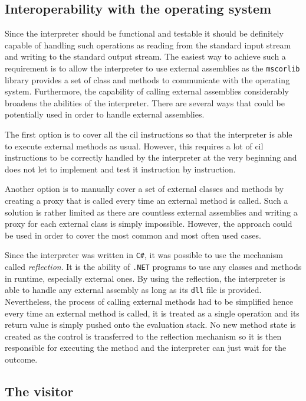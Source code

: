 \documentclass[declaration,shortabstract,english,mgr]{iithesis}
\begin{document}
\subsection{Interoperability with the operating system}

Since the interpreter should be functional and testable it should be definitely capable of handling such operations as reading from the standard input stream and writing to the standard output stream. The easiest way to achieve such a requirement is to allow the interpreter to use external assemblies as the \texttt{mscorlib} library provides a set of class and methods to communicate with the operating system. Furthermore, the capability of calling external assemblies considerably broadens the abilities of the interpreter. There are several ways that could be potentially used in order to handle external assemblies.

The first option is to cover all the \acrshort{cil} instructions so that the interpreter is able to execute external methods as usual. However, this requires a lot of \acrshort{cil} instructions to be correctly handled by the interpreter at the very beginning and does not let to implement and test it instruction by instruction.

Another option is to manually cover a set of external classes and methods by creating a proxy that is called every time an external method is called. Such a solution is rather limited as there are countless external assemblies and writing a proxy for each external class is simply impossible. However, the approach could be used in order to cover the most common and most often used cases.

Since the interpreter was written in \texttt{C\#}, it was possible to use the mechanism called \textit{reflection}. It is the ability of \texttt{.NET} programs to use any classes and methods in runtime, especially external ones. By using the reflection, the interpreter is able to handle any external assembly as long as its \texttt{dll} file is provided. Nevertheless, the process of calling external methods had to be simplified hence every time an external method is called, it is treated as a single operation and its return value is simply pushed onto the evaluation stack. No new method state is created as the control is transferred to the reflection mechanism so it is then responsible for executing the method and the interpreter can just wait for the outcome.

\subsection{The visitor}
\label{sec:visitor}
\end{document}

